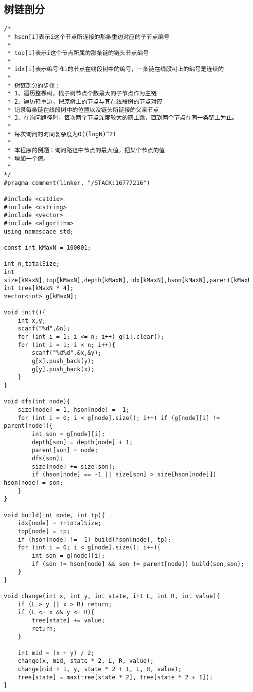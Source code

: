 \subsection{树链剖分}
\begin{verbatim}
/*
 * hson[i]表示i这个节点所连接的那条重边对应的子节点编号
 *
 * top[i]表示i这个节点所属的那条链的链头节点编号
 * 
 * idx[i]表示编号唯i的节点在线段树中的编号，一条链在线段树上的编号是连续的
 *
 * 树链剖分的步骤：
 * 1、遍历整棵树，找子树节点个数最大的子节点作为主链
 * 2、遍历轻重边，把原树上的节点与其在线段树的节点对应
 * 记录每条链在线段树中的位置以及链头所链接的父亲节点
 * 3、在询问路径时，每次两个节点深度较大的网上跳，直到两个节点在同一条链上为止。
 *
 * 每次询问的时间复杂度为O((logN)^2)
 *
 * 本程序的例题：询问路径中节点的最大值。把某个节点的值
 * 增加一个值。
 *
*/
#pragma comment(linker, "/STACK:16777216")

#include <cstdio>
#include <cstring>
#include <vector>
#include <algorithm>
using namespace std;

const int kMaxN = 100001;

int n,totalSize;
int size[kMaxN],top[kMaxN],depth[kMaxN],idx[kMaxN],hson[kMaxN],parent[kMaxN];
int tree[kMaxN * 4];
vector<int> g[kMaxN];

void init(){
    int x,y;
    scanf("%d",&n);
    for (int i = 1; i <= n; i++) g[i].clear();
    for (int i = 1; i < n; i++){
        scanf("%d%d",&x,&y);
        g[x].push_back(y);
        g[y].push_back(x);
    }
}

void dfs(int node){
    size[node] = 1, hson[node] = -1;
    for (int i = 0; i < g[node].size(); i++) if (g[node][i] != parent[node]){
        int son = g[node][i];
        depth[son] = depth[node] + 1;
        parent[son] = node;
        dfs(son);
        size[node] += size[son];
        if (hson[node] == -1 || size[son] > size[hson[node]]) hson[node] = son;
    }
}

void build(int node, int tp){
    idx[node] = ++totalSize; 
    top[node] = tp;
    if (hson[node] != -1) build(hson[node], tp);
    for (int i = 0; i < g[node].size(); i++){
        int son = g[node][i];
        if (son != hson[node] && son != parent[node]) build(son,son);
    }
}

void change(int x, int y, int state, int L, int R, int value){
    if (L > y || x > R) return;
    if (L <= x && y <= R){
        tree[state] += value;
        return;
    }

    int mid = (x + y) / 2;
    change(x, mid, state * 2, L, R, value);
    change(mid + 1, y, state * 2 + 1, L, R, value);
    tree[state] = max(tree[state * 2], tree[state * 2 + 1]);
}


\end{verbatim}
